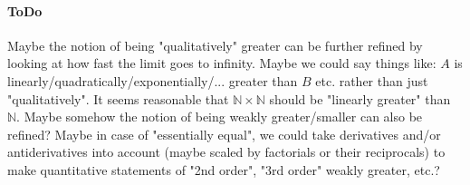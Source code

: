 \documentclass[12pt]{article}
\begin{document}
\paragraph{ToDo}
Maybe the notion of being "qualitatively" greater can be further refined by looking at how fast the limit goes to infinity. Maybe we could say things like: $A$ is linearly/quadratically/exponentially/... greater than $B$ etc. rather than just "qualitatively". It seems reasonable that $\mathbb{N} \times \mathbb{N}$ should be "linearly greater" than $\mathbb{N}$. Maybe somehow the notion of being weakly greater/smaller can also be refined? Maybe in case of "essentially equal", we could take derivatives and/or antiderivatives into account (maybe scaled by factorials or their reciprocals) to make quantitative statements of "2nd order", "3rd order" weakly greater, etc.? 
\end{document}
